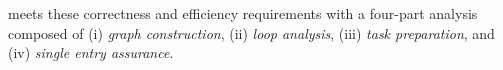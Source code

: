 %
%

\sys meets these correctness and efficiency requirements with a four-part
analysis composed of (i) \emph{graph construction}, (ii) \emph{loop analysis},
(iii) \emph{task preparation}, and (iv) \emph{single entry assurance}.

